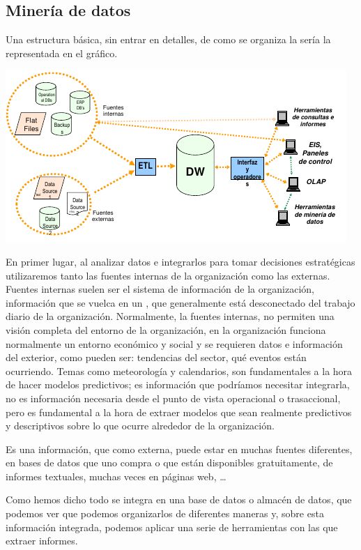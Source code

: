 \subsection{Minería de datos}

Una estructura básica, sin entrar en detalles, de como se organiza la  sería la representada en el gráfico.

\begin{center}
    \includegraphics[scale=.8]{images/mod01-08.png}
\end{center}

En primer lugar, al analizar datos e integrarlos para tomar decisiones estratégicas utilizaremos tanto las fuentes internas de la organización como las externas. Fuentes internas suelen ser el sistema de información de la organización, información que se vuelca en un , que generalmente está desconectado del trabajo diario de la organización. Normalmente, la fuentes internas, no permiten una visión completa del entorno de la organización, en la organización funciona normalmente un entorno económico y social y se requieren datos e información del exterior, como pueden ser: tendencias del sector, qué eventos están ocurriendo. Temas como meteorología y calendarios, son fundamentales a la hora de hacer modelos predictivos; es información que podríamos necesitar integrarla, no es información necesaria desde el punto de vista operacional o trasaccional, pero es fundamental a la hora de extraer modelos que sean realmente predictivos y descriptivos sobre lo que ocurre alrededor de la organización. 

Es una información, que como externa, puede estar en muchas fuentes diferentes, en bases de datos que uno compra o que están disponibles gratuitamente, de informes textuales, muchas veces en páginas web, \ldots

Como hemos dicho todo se integra en una base de datos o almacén de datos, que podemos ver que podemos organizarlos de diferentes maneras y, sobre esta información integrada, podemos aplicar una serie de herramientas con las que extraer informes.

